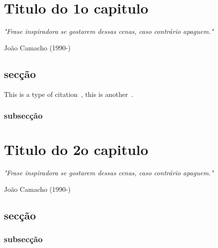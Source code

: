 \documentclass[12pt,a4paper]{ThesisClass}
\begin{document}
\FloatBarrier
\newpage
\chapter{Titulo do 1o capitulo}\label{ch:01cap1}
\begin{center}
\begin{minipage}{15cm}
\textit{"Frase inspiradora se gostarem dessas cenas, caso contrário apaguem."}

\hfill João Camacho (1990-)\\
\end{minipage}
\end{center}

\section{secção}

This is a type of citation~\citep{Abramowitz1972}, this is another~\cite{Blum2013}.

\subsection{subsecção}


\FloatBarrier
\newpage
\chapter{Titulo do 2o capitulo}\label{ch:02cap2}
\begin{center}
\begin{minipage}{15cm}
\textit{"Frase inspiradora se gostarem dessas cenas, caso contrário apaguem."}

\hfill João Camacho (1990-)\\
\end{minipage}
\end{center}

\section{secção}

\subsection{subsecção}
\end{document}
